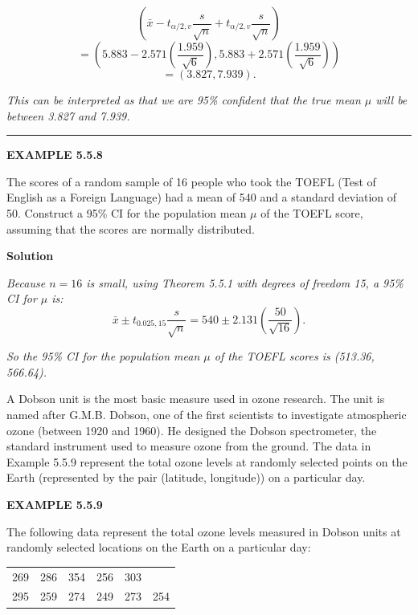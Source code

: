 \[
\left(\bar{x} - t_{\alpha/2,v} \frac{s}{\sqrt{n}} + t_{\alpha/2,v} \frac{s}{\sqrt{n}}\right)
\]
\[
= \left(5.883 - 2.571 \left(\frac{1.959}{\sqrt{6}}\right), 5.883 + 2.571 \left(\frac{1.959}{\sqrt{6}}\right)\right)
\]
\[
= (3.827, 7.939).
\]

\textit{This can be interpreted as that we are 95\% confident that the true mean $\mu$ will be between 3.827 and 7.939.}

\vspace{1em}
\hrule
\vspace{0.5em}

\textbf{EXAMPLE 5.5.8}

The scores of a random sample of 16 people who took the TOEFL (Test of English as a Foreign Language) had a mean of 540 and a standard deviation of 50. Construct a 95\% CI for the population mean $\mu$ of the TOEFL score, assuming that the scores are normally distributed.

\textbf{Solution}

\textit{Because $n = 16$ is small, using Theorem 5.5.1 with degrees of freedom 15, a 95\% CI for $\mu$ is:}
\[
\bar{x} \pm t_{0.025, 15} \frac{s}{\sqrt{n}} = 540 \pm 2.131 \left(\frac{50}{\sqrt{16}}\right).
\]

\textit{So the 95\% CI for the population mean $\mu$ of the TOEFL scores is (513.36, 566.64).}

\vspace{1em}

A Dobson unit is the most basic measure used in ozone research. The unit is named after G.M.B. Dobson, one of the first scientists to investigate atmospheric ozone (between 1920 and 1960). He designed the Dobson spectrometer, the standard instrument used to measure ozone from the ground. The data in Example 5.5.9 represent the total ozone levels at randomly selected points on the Earth (represented by the pair (latitude, longitude)) on a particular day.

\vspace{1em}

\textbf{EXAMPLE 5.5.9}

The following data represent the total ozone levels measured in Dobson units at randomly selected locations on the Earth on a particular day:

\begin{center}
\begin{tabular}{cccccc}
269 & 286 & 354 & 256 & 303 \\
295 & 259 & 274 & 249 & 273 & 254 \\
\end{tabular}
\end{center}

